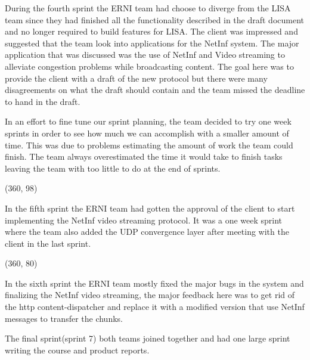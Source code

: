 During the fourth sprint the ERNI team had choose to diverge from the LISA team since they had finished all the functionality described in the draft document and no longer required to build features for LISA. The client was impressed and suggested that the team look into applications for the NetInf system. The major application that was discussed was the use of NetInf and Video streaming to alleviate congestion problems while broadcasting content. The goal here was to provide the client with a draft of the new protocol but there were many disagreements on what the draft should contain and the team missed the deadline to hand in the draft.

In an effort to fine tune our sprint planning, the team decided to try one week sprints in order to see how much we can accomplish with a smaller amount of time. This was due to problems estimating the amount of work the team could finish. The team always overestimated the time it would take to finish tasks leaving the team with too little to do at the end of sprints.

\framebox(360, 98){
	
}

In the fifth sprint the ERNI team had gotten the approval of the client to start implementing the NetInf video streaming protocol. It was a one week sprint where the team also added the UDP convergence layer after meeting with the client in the last sprint.


\framebox(360, 80){
}

In the sixth sprint the ERNI team mostly fixed the major bugs in the system and finalizing the NetInf video streaming, the major feedback here was to get rid of the http content-dispatcher and replace it with a modified version that use NetInf messages to transfer the chunks.

The final sprint(sprint 7) both teams joined together and had one large sprint writing the course and product reports.
